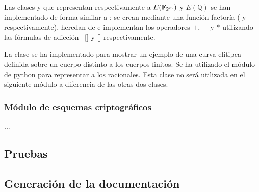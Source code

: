 Las clases  y  que representan respectivamente a $E(\mathbb{F}_{2^m})$ y $E(\mathbb{Q})$ se han implementado de forma similar a : se crean mediante una función factoría ( y  respectivamente), heredan de  e implementan los operadores $+$, $-$ y $*$ utilizando las fórmulas de adicción ~\ref{} y \ref{} respectivamente.

La clase  se ha implementado para mostrar un ejemplo de una curva elítipca definida sobre un cuerpo distinto a los cuerpos finitos. Se ha utilizado el módulo  de python para representar a los racionales. Esta clase no será utilizada en el siguiente módulo a diferencia de las otras dos clases.

\subsubsection{Módulo de esquemas criptográficos}
\label{subs:Módulo de esquemas criptográficos}

...

\subsection{Pruebas}
\label{sub:Pruebas}


\subsection{Generación de la documentación}
\label{sub:Generación de la documentación}

